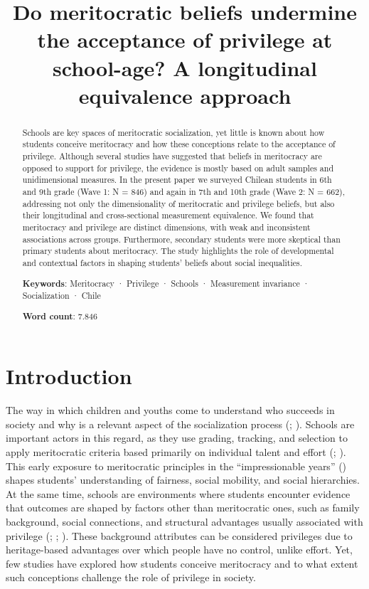 \documentclass[
  11pt,
]{article}
\author{}
\title{Do meritocratic beliefs undermine the acceptance of privilege at
school-age? A longitudinal equivalence approach}
\date{}
\begin{document}
\maketitle
\begin{abstract}
Schools are key spaces of meritocratic socialization, yet little is
known about how students conceive meritocracy and how these conceptions
relate to the acceptance of privilege. Although several studies have
suggested that beliefs in meritocracy are opposed to support for
privilege, the evidence is mostly based on adult samples and
unidimensional measures. In the present paper we surveyed Chilean
students in 6th and 9th grade (Wave 1: N = 846) and again in 7th and
10th grade (Wave 2: N = 662), addressing not only the dimensionality of
meritocratic and privilege beliefs, but also their longitudinal and
cross-sectional measurement equivalence. We found that meritocracy and
privilege are distinct dimensions, with weak and inconsistent
associations across groups. Furthermore, secondary students were more
skeptical than primary students about meritocracy. The study highlights
the role of developmental and contextual factors in shaping students'
beliefs about social inequalities. \medskip

\textbf{Keywords}: Meritocracy · Privilege · Schools · Measurement
invariance · Socialization · Chile

\medskip

\textbf{Word count}: 7.846
\end{abstract}


\section{Introduction}\label{introduction}

The way in which children and youths come to understand who succeeds in
society and why is a relevant aspect of the socialization process
(;
). Schools are
important actors in this regard, as they use grading, tracking, and
selection to apply meritocratic criteria based primarily on individual
talent and effort (; ). This
early exposure to meritocratic principles in the ``impressionable
years'' ()
shapes students' understanding of fairness, social mobility, and social
hierarchies. At the same time, schools are environments where students
encounter evidence that outcomes are shaped by factors other than
meritocratic ones, such as family background, social connections, and
structural advantages usually associated with privilege
(;
;
). These
background attributes can be considered privileges due to heritage-based
advantages over which people have no control, unlike effort. Yet, few
studies have explored how students conceive meritocracy and to what
extent such conceptions challenge the role of privilege in society.
\end{document}
